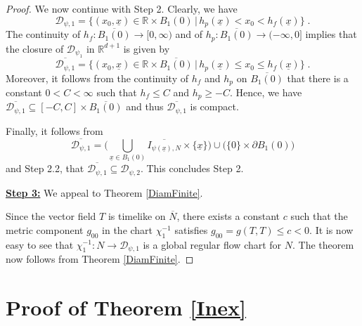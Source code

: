 \documentclass[reqno]{article}
\newcommand{\R}{\mathbb{R}}
\newcommand{\D}{\mathcal{D}}
\newcommand{\ux}{\underline{x}}
\begin{document}
\begin{proof}
We now continue with Step 2. Clearly, we have
\begin{equation*}
\D_{\psi,1} = \{(x_0, \ux) \in \R \times B_1(0) \, | \, h_p(\ux) < x_0 < h_f(\ux)\} \;.
\end{equation*}
The continuity of $h_f : \overline{B_1(0)} \to [0, \infty)$ and of $h_p : \overline{B_1(0)} \to (-\infty, 0]$ implies that the closure of $\D_{\psi_1}$ in $\R^{d+1}$ is given by
\begin{equation*}
\overline{\D_{\psi,1}} = \{(x_0, \ux) \in \R \times \overline{B_1(0)} \, | \, h_p(\ux) \leq x_0 \leq h_f(\ux)\} \;.
\end{equation*}
Moreover, it follows from the continuity of $h_f$ and $h_p$ on $\overline{B_1(0)}$ that there is a constant $0< C < \infty$ such that $h_f \leq C$ and $h_p \geq -C$. Hence, we have $\overline{\D_{\psi,1}} \subseteq [-C,C] \times \overline{B_1(0)}$ and thus $\overline{\D_{\psi,1}}$ is compact.

Finally, it follows from 
\begin{equation*}
\overline{\D_{\psi,1}} = \Big(\bigcup_{\ux \in B_1(0)} \overline{I_{\psi(\ux),N}} \times \{\ux\}\Big) \cup \big(\{0\} \times \partial B_1(0)\big)
\end{equation*}
and Step 2.2, that  $\overline{\D_{\psi,1}} \subseteq \D_{\psi,2}$.
This concludes Step 2.
\vspace*{2mm}

\underline{\textbf{Step 3:}} We appeal to Theorem \ref{DiamFinite}.
\vspace*{2mm}

Since the vector field $T$ is timelike on $\overline{N}$, there exists a constant $c$ such that the metric component $g_{00}$ in the chart $\chi_1^{-1}$ satisfies $g_{00} = g(T,T) \leq c <0$. It is now easy to see that $\chi_1^{-1} : N \to \D_{\psi,1}$ is a global regular flow chart for $N$. The theorem now follows from Theorem \ref{DiamFinite}.
\end{proof}






















\section{Proof of Theorem \ref{Inex}}
\label{SecPf}
\end{document}
